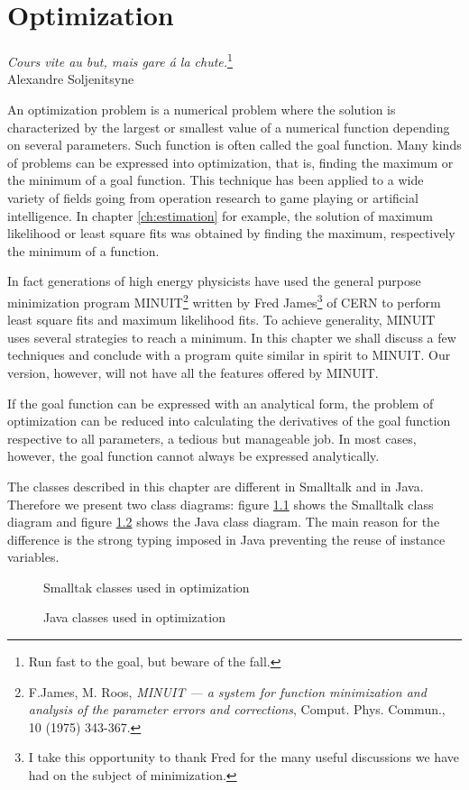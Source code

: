 \documentclass[twoside]{book}
\begin{document}
\fi

\chapter{Optimization}
\label{ch:minimization} \vspace{1 ex}
\begin{flushright}
{\sl Cours vite au but, mais gare \'a la chute.}\footnote{Run fast
to the goal, but beware of the fall.}\\ Alexandre Soljenitsyne
\end{flushright}
\vspace{1 ex} An optimization problem is a numerical problem where
the solution is characterized by the largest or smallest value of
a numerical function depending on several parameters. Such
function is often called the goal function. Many kinds of problems
can be expressed into optimization, that is, finding the maximum
or the minimum of a goal function. This technique has been applied
to a wide variety of fields going from operation research to game
playing or artificial intelligence. In chapter \ref{ch:estimation}
for example, the solution of maximum likelihood or least square
fits was obtained by finding the maximum, respectively the minimum
of a function.

In fact generations of high energy physicists have used the
general purpose minimization program MINUIT\footnote{F.James, M.
Roos, {\sl MINUIT --- a system for function minimization and
analysis of the parameter errors and corrections}, Comput. Phys.
Commun., 10 (1975) 343-367.} written by Fred James\footnote{I take
this opportunity to thank Fred for the many useful discussions we
have had on the subject of minimization.} of CERN to perform least
square fits and maximum likelihood fits.  To achieve generality,
MINUIT uses several strategies to reach a minimum. In this chapter
we shall discuss a few techniques and conclude with a program
quite similar in spirit to MINUIT. Our version, however, will not
have all the features offered by MINUIT.

If the goal function can be expressed with an analytical form, the
problem of optimization can be reduced into calculating the
derivatives of the goal function respective to all parameters, a
tedious but manageable job. In most cases, however, the goal
function cannot always be expressed analytically.

The classes described in this chapter are different in Smalltalk
and in Java. Therefore we present two class diagrams: figure
\ref{fig:soptimizingclasses} shows the Smalltalk class diagram and
figure \ref{fig:joptimizingclasses} shows the Java class diagram.
The main reason for the difference is the strong typing imposed in
Java preventing the reuse of instance variables.
\begin{figure}
\center{}
\caption{Smalltak classes used in optimization}
\label{fig:soptimizingclasses}
\end{figure}
\begin{figure}
\center{}
\caption{Java classes used in optimization}
\label{fig:joptimizingclasses}
\end{figure}
\end{document}
